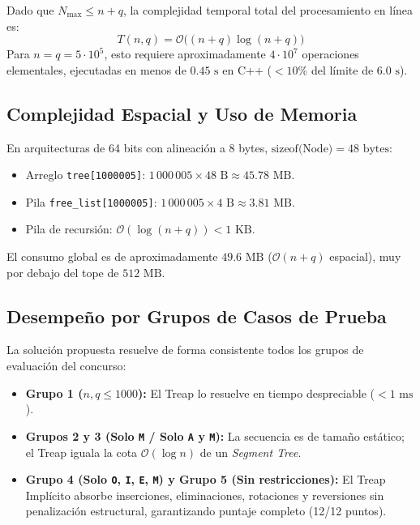 \documentclass[journal,10pt,a4paper]{IEEEtran}
\begin{document}
Dado que $N_{\max} \le n + q$, la complejidad temporal total del procesamiento en línea es:
\begin{equation}
    T(n, q) = \mathcal{O}\big((n + q) \log(n + q)\big)
\end{equation}
Para $n = q = 5 \cdot 10^5$, esto requiere aproximadamente $4 \cdot 10^7$ operaciones elementales, ejecutadas en menos de $0.45\text{ s}$ en C++ ($< 10\%$ del límite de $6.0\text{ s}$).

\subsection{Complejidad Espacial y Uso de Memoria}

En arquitecturas de 64 bits con alineación a 8 bytes, $\text{sizeof(Node)} = 48\text{ bytes}$:
\begin{itemize}
    \item Arreglo \texttt{tree[1000005]}: $1\,000\,005 \times 48\text{ B} \approx 45.78\text{ MB}$.
    \item Pila \texttt{free\_list[1000005]}: $1\,000\,005 \times 4\text{ B} \approx 3.81\text{ MB}$.
    \item Pila de recursión: $\mathcal{O}(\log(n + q)) < 1\text{ KB}$.
\end{itemize}
El consumo global es de aproximadamente $49.6\text{ MB}$ ($\mathcal{O}(n + q)$ espacial), muy por debajo del tope de $512\text{ MB}$.

\subsection{Desempeño por Grupos de Casos de Prueba}

La solución propuesta resuelve de forma consistente todos los grupos de evaluación del concurso:
\begin{itemize}
    \item \textbf{Grupo 1 ($n, q \le 1000$):} El Treap lo resuelve en tiempo despreciable ($< 1\text{ ms}$).
    \item \textbf{Grupos 2 y 3 (Solo \texttt{M} / Solo \texttt{A} y \texttt{M}):} La secuencia es de tamaño estático; el Treap iguala la cota $\mathcal{O}(\log n)$ de un \textit{Segment Tree}.
    \item \textbf{Grupo 4 (Solo \texttt{O}, \texttt{I}, \texttt{E}, \texttt{M}) y Grupo 5 (Sin restricciones):} El Treap Implícito absorbe inserciones, eliminaciones, rotaciones y reversiones sin penalización estructural, garantizando puntaje completo (12/12 puntos).
\end{itemize}
\end{document}
